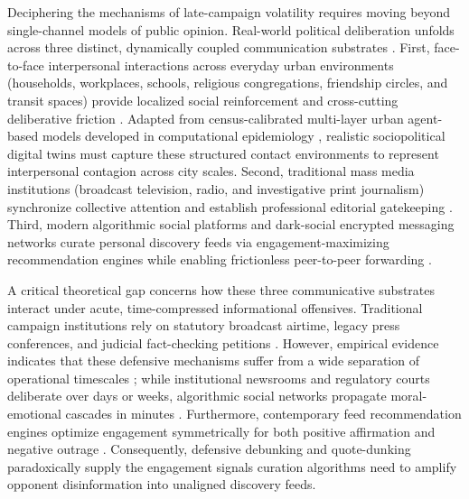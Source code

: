 \documentclass[a4paper,fleqn]{cas-dc}
\begin{document}
Deciphering the mechanisms of late-campaign volatility requires moving beyond single-channel models of public opinion. Real-world political deliberation unfolds across three distinct, dynamically coupled communication substrates \citep{boccaletti2014structure, kivela2014multilayer}. First, face-to-face interpersonal interactions across everyday urban environments (households, workplaces, schools, religious congregations, friendship circles, and transit spaces) provide localized social reinforcement and cross-cutting deliberative friction \citep{granovetter1973strength, mcpherson2001birds}. Adapted from census-calibrated multi-layer urban agent-based models developed in computational epidemiology \citep{lopes2022measuring}, realistic sociopolitical digital twins must capture these structured contact environments to represent interpersonal contagion across city scales. Second, traditional mass media institutions (broadcast television, radio, and investigative print journalism) synchronize collective attention and establish professional editorial gatekeeping \citep{mccombs1972agenda, gentzkow2006media}. Third, modern algorithmic social platforms and dark-social encrypted messaging networks curate personal discovery feeds via engagement-maximizing recommendation engines while enabling frictionless peer-to-peer forwarding \citep{cinelli2021echo, vosoughi2018spread, cesarino2020posverdade}. 

A critical theoretical gap concerns how these three communicative substrates interact under acute, time-compressed informational offensives. Traditional campaign institutions rely on statutory broadcast airtime, legacy press conferences, and judicial fact-checking petitions \citep{gentzkow2006media, chadwick2017hybrid}. However, empirical evidence indicates that these defensive mechanisms suffer from a wide separation of operational timescales \citep{downs1972up, harder2017intermedia}; while institutional newsrooms and regulatory courts deliberate over days or weeks, algorithmic social networks propagate moral-emotional cascades in minutes \citep{brady2017emotion, vosoughi2018spread}. Furthermore, contemporary feed recommendation engines optimize engagement symmetrically for both positive affirmation and negative outrage \citep{crockett2017moral, bail2018exposure}. Consequently, defensive debunking and quote-dunking paradoxically supply the engagement signals curation algorithms need to amplify opponent disinformation into unaligned discovery feeds.
\end{document}
